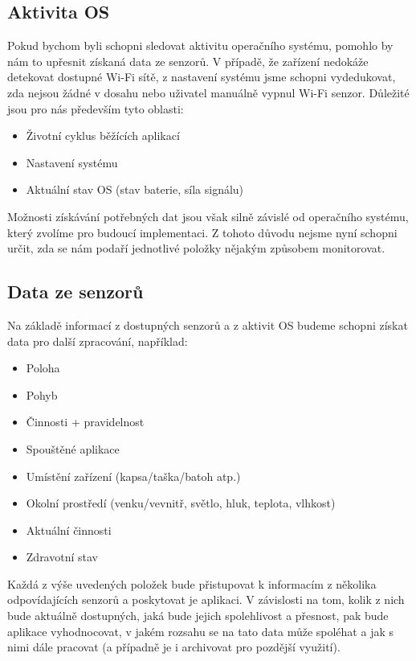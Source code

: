 \documentclass[thesis=M,czech]{FITthesis}[2012/06/26]
\begin{document}
\subsection{Aktivita OS}
Pokud bychom byli schopni sledovat aktivitu operačního systému, pomohlo by nám to upřesnit získaná data ze senzorů. V případě, že zařízení nedokáže detekovat dostupné Wi-Fi sítě, z nastavení systému jsme schopni vydedukovat, zda nejsou žádné v dosahu nebo uživatel manuálně vypnul Wi-Fi senzor. Důležité jsou pro nás především tyto oblasti:

\begin{itemize}
\item    Životní cyklus běžících aplikací
\item    Nastavení systému
\item    Aktuální stav OS (stav baterie, síla signálu)
\end{itemize}

Možnosti získávání potřebných dat jsou však silně závislé od operačního systému, který zvolíme pro budoucí implementaci. Z tohoto důvodu nejsme nyní schopni určit, zda se nám podaří jednotlivé položky nějakým způsobem monitorovat.

\subsection{Data ze senzorů}
Na základě informací z dostupných senzorů a z aktivit OS budeme schopni získat data pro další zpracování, například:

\begin{itemize}
\item    Poloha
\item    Pohyb
\item    Činnosti + pravidelnost
\item    Spouštěné aplikace
\item    Umístění zařízení (kapsa/taška/batoh atp.)
\item    Okolní prostředí (venku/vevnitř, světlo, hluk, teplota, vlhkost)
\item    Aktuální činnosti
\item    Zdravotní stav
\end{itemize}

Každá z výše uvedených položek bude přistupovat k informacím z několika odpovídajících senzorů a poskytovat je aplikaci. V závislosti na tom, kolik z nich bude aktuálně dostupných, jaká bude jejich spolehlivost a přesnost, pak bude aplikace vyhodnocovat, v jakém rozsahu se na tato data může spoléhat a jak s nimi dále pracovat (a případně je i archivovat pro pozdější využití).
\end{document}
